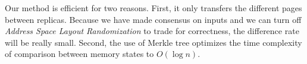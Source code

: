 Our method is efficient for two reasons. First, it only transfers the different 
pages between replicas. Because we have made consensus on inputs and we can 
turn off \textit{Address Space Layout Randomization} to trade for correctness, 
the difference rate will be really small. Second, the use of Merkle tree 
optimizes the time complexity of comparison between memory states to $O(\log 
n)$.


% 
% 

